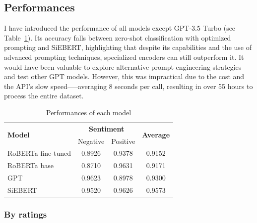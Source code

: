 \documentclass{article}
\begin{document}
\subsection{Performances}

I have introduced the performance of all models except GPT-3.5 Turbo (see Table~\ref{tab:perfs_by_sentiment}). Its accuracy falls between zero-shot classification with optimized prompting and SiEBERT, highlighting that despite its capabilities and the use of advanced prompting techniques, specialized encoders can still outperform it. It would have been valuable to explore alternative prompt engineering strategies and test other GPT models. However, this was impractical due to the cost and the API's slow speed--—averaging 8 seconds per call, resulting in over 55 hours to process the entire dataset.


\begin{table}
  \caption{Performances of each model}
  \label{tab:perfs_by_sentiment}
  \centering
  \begin{tabular}{lccc}
    \toprule
    \multirow{2}{*}{\centering \textbf{Model}} & \multicolumn{2}{c}{\textbf{Sentiment}} & \multirow{2}{*}{\centering \textbf{Average}} \\
    \cmidrule{2-3}
    & Negative & Positive \\
    \midrule
    RoBERTa fine-tuned & 0.8926 & 0.9378 & 0.9152 \\
    RoBERTa base & 0.8710 & 0.9631 & 0.9171 \\
    GPT & 0.9623 & 0.8978 & 0.9300 \\
    SiEBERT & 0.9520 & 0.9626 & 0.9573 \\
    \bottomrule
  \end{tabular}
\end{table}

\subsubsection{By ratings}
\end{document}
